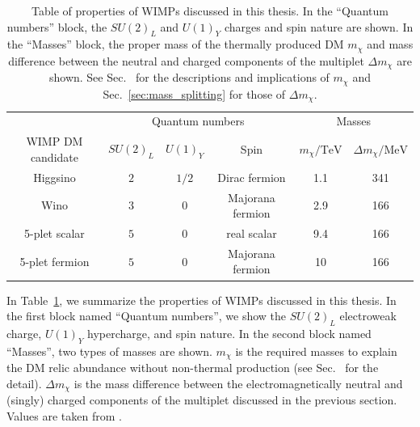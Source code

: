 \documentclass[12pt,twoside,book]{article}
\begin{document}
\begin{table}
  \centering
  \begin{tabular}{c|ccc|cc}
    & \multicolumn{3}{c|}{Quantum numbers} & \multicolumn{2}{c}{Masses}\\
    WIMP DM candidate & $SU(2)_L$ & $U(1)_Y$ & Spin & $m_\chi / \mathrm{TeV}$ &
    $\Delta m_\chi / \mathrm{MeV}$ \\
    \hline
    Higgsino & $2$ & $1/2$ & Dirac fermion & 1.1 & 341 \\
    Wino & $3$ & $0$ & Majorana fermion & 2.9 & 166 \\
    5-plet scalar & $5$ & $0$ & real scalar & 9.4 & 166 \\
    5-plet fermion & $5$ & $0$ & Majorana fermion & 10 & 166
  \end{tabular}
  \caption{
    Table of properties of WIMPs discussed in this thesis.
    In the ``Quantum numbers'' block, the $SU(2)_L$ and $U(1)_Y$ charges and spin nature are shown.
    In the ``Masses'' block, the proper mass of the thermally produced DM $m_\chi$ and mass difference between the neutral and charged components of the multiplet $\Delta m_\chi$ are shown.
    See Sec.~ for the descriptions and implications of $m_\chi$ and Sec.~\ref{sec:mass_splitting} for those of $\Delta m_\chi$.
  }
  \label{tab:WIMP_property}
\end{table}

In Table~\ref{tab:WIMP_property}, we summarize the properties of WIMPs discussed in this thesis.
In the first block named ``Quantum numbers'', we show the $SU(2)_L$ electroweak charge, $U(1)_Y$ hypercharge, and spin nature.
In the second block named ``Masses'', two types of masses are shown.
$m_\chi$ is the required masses to explain the DM relic abundance without non-thermal production (see Sec.~ for the detail).
$\Delta m_\chi$ is the mass difference between the electromagnetically neutral and (singly) charged components of the multiplet discussed in the previous section.
Values are taken from \cite{Farina:2013mla, ArkaniHamed:2006mb, Hisano:2006nn,  Cirelli:2007xd, Moroi:2013sla, Beneke:2016ync}.

% 
% 
\end{document}
